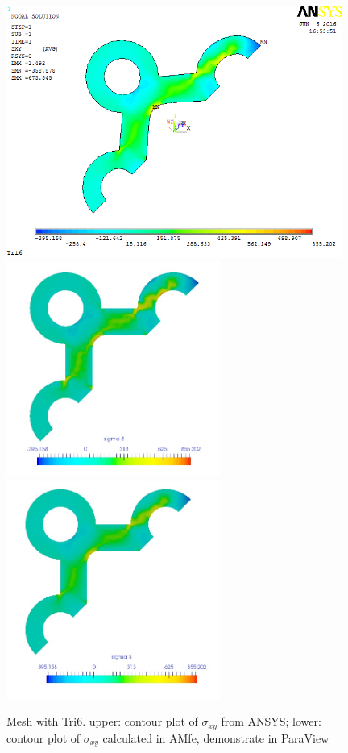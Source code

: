 \begin{figure}[htbp]
	\begin{center}
		\includegraphics[width=11cm,clip]{Tri6_Sxy.png} 		
		\includegraphics[width=7cm,clip]{Tri6_Sxy_PD.png} 		
		\includegraphics[width=7cm,clip]{Tri6_Sxy_P.png} 		
		\caption{Mesh with Tri6. upper: contour plot of $\sigma_{xy}$ from ANSYS; lower: contour plot of $\sigma_{xy}$ calculated in AMfe, demonstrate in ParaView} \label{fig: Tri6_Sxy}
	\end{center}
\end{figure}
\clearpage 


